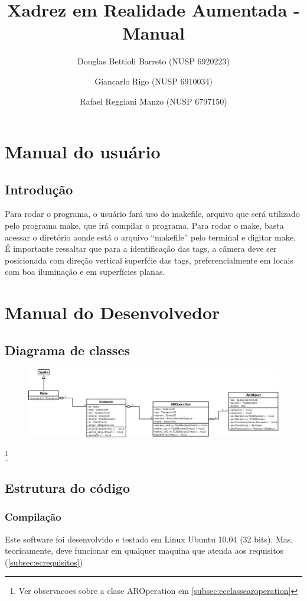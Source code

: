 \documentclass[a4paper,12pt]{book}
\title{Xadrez em Realidade Aumentada - Manual}
\author{
		Douglas Bettioli Barreto (NUSP 6920223)
		\and Giancarlo Rigo (NUSP 6910034)
		\and Rafael Reggiani Manzo (NUSP 6797150)
	   }
\begin{document}
\maketitle

\part{Manual do usu\'ario}
\label{part:manualdousuario}
	\chapter{Introdu\c c\~ao}
	Para rodar o programa, o usuário far\'a uso do makefile, arquivo que ser\'a
	utilizado pelo programa make, que ir\'a compilar o programa. Para rodar o make,
	basta acessar o diret\'orio aonde está o arquivo “makefile” pelo terminal e
	digitar make. \'E importante ressaltar que para a identifica\c c\~ao das tags,
	a c\^amera deve ser posicionada com direção vertical \` superf\'cie das tags, preferencialmente em locais com boa iluminação e em superf\'icies planas.

\part{Manual do Desenvolvedor}
\label{part:manualdodesenvolvedor}
	\chapter{Diagrama de classes}
	\label{ch:diagramadeclasses}
	\begin{figure}[h]
	\centering
	\includegraphics[width=1.2\textwidth]{diagramadeclasses}
	\end{figure}
	\footnote{Ver observacoes sobre a clase AROperation em
			  \ref{subsec:ecclassearoperation}
			 }
			 
	\chapter{Estrutura do c\'odigo}
	\label{ch:estruturadocodigo}
	
	\section{Compila\c c\~ao}
	\label{sec:eccompilacao}
	Este software foi desenvolvido e testado em Linux Ubuntu 10.04 (32 bits). Mas,
	teoricamente, deve funcionar em qualquer maquina que atenda aos requisitos
	(\ref{subsec:ecrequisitos})
	
\end{document}
